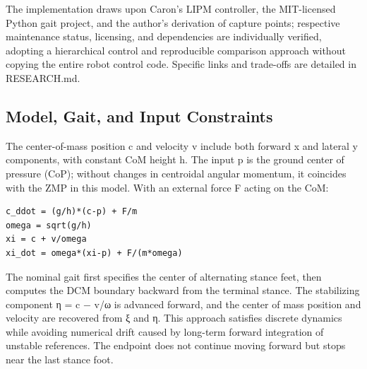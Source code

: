 The implementation draws upon Caron's LIPM controller, the MIT-licensed Python gait project, and the author's derivation of capture points; respective maintenance status, licensing, and dependencies are individually verified, adopting a hierarchical control and reproducible comparison approach without copying the entire robot control code. Specific links and trade-offs are detailed in RESEARCH.md.

\subsection{Model, Gait, and Input Constraints}\label{s17-detail-2}

The center-of-mass position c and velocity v include both forward x and lateral y components, with constant CoM height h. The input p is the ground center of pressure (CoP); without changes in centroidal angular momentum, it coincides with the ZMP in this model. With an external force F acting on the CoM:

\begin{Verbatim}[breaklines=true,breakanywhere=true,fontsize=\footnotesize]
c_ddot = (g/h)*(c-p) + F/m
omega = sqrt(g/h)
xi = c + v/omega
xi_dot = omega*(xi-p) + F/(m*omega)
\end{Verbatim}

The nominal gait first specifies the center of alternating stance feet, then computes the DCM boundary backward from the terminal stance. The stabilizing component η = c − v/ω is advanced forward, and the center of mass position and velocity are recovered from ξ and η. This approach satisfies discrete dynamics while avoiding numerical drift caused by long-term forward integration of unstable references. The endpoint does not continue moving forward but stops near the last stance foot.

